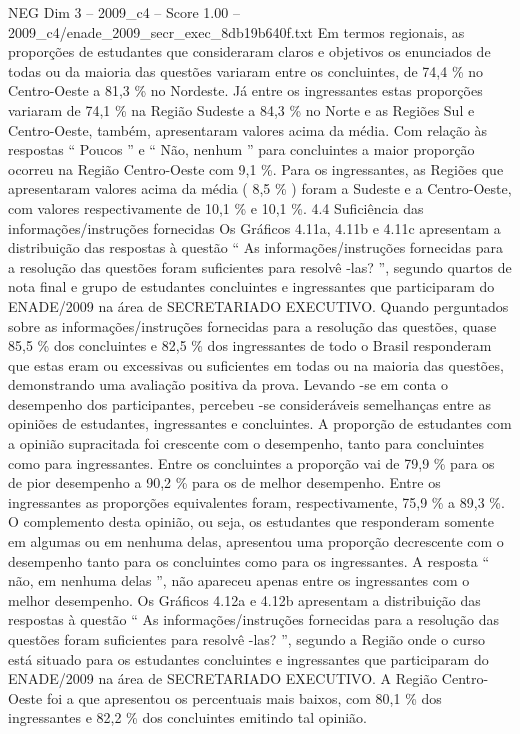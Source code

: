 \begin{textsample}{NEG Dim 3 – 2009\_c4 – Score 1.00 – 2009\_c4/enade\_2009\_secr\_exec\_8db19b640f.txt}
Em termos regionais, as proporções de estudantes que consideraram claros e objetivos os enunciados de todas ou da maioria das questões variaram entre os concluintes, de 74,4 \% no Centro-Oeste a 81,3 \% no Nordeste.
Já entre os ingressantes estas proporções variaram de 74,1 \% na Região Sudeste a 84,3 \% no Norte e as Regiões Sul e Centro-Oeste, também, apresentaram valores acima da média.
Com relação às respostas “ Poucos ” e “ Não, nenhum ” para concluintes a maior proporção ocorreu na Região Centro-Oeste com 9,1 \%.
Para os ingressantes, as Regiões que apresentaram valores acima da média ( 8,5 \% ) foram a Sudeste e a Centro-Oeste, com valores respectivamente de 10,1 \% e 10,1 \%. 4.4 Suficiência das informações/instruções fornecidas Os Gráficos 4.11a, 4.11b e 4.11c apresentam a distribuição das respostas à questão “ As informações/instruções fornecidas para a resolução das questões foram suficientes para resolvê -las? ”, segundo quartos de nota final e grupo de estudantes concluintes e ingressantes que participaram do ENADE/2009 na área de SECRETARIADO EXECUTIVO.
Quando perguntados sobre as informações/instruções fornecidas para a resolução das questões, quase 85,5 \% dos concluintes e 82,5 \% dos ingressantes de todo o Brasil responderam que estas eram ou excessivas ou suficientes em todas ou na maioria das questões, demonstrando uma avaliação positiva da prova.
Levando -se em conta o desempenho dos participantes, percebeu -se consideráveis semelhanças entre as opiniões de estudantes, ingressantes e concluintes.
A proporção de estudantes com a opinião supracitada foi crescente com o desempenho, tanto para concluintes como para ingressantes.
Entre os concluintes a proporção vai de 79,9 \% para os de pior desempenho a 90,2 \% para os de melhor desempenho.
Entre os ingressantes as proporções equivalentes foram, respectivamente, 75,9 \% a 89,3 \%.
O complemento desta opinião, ou seja, os estudantes que responderam somente em algumas ou em nenhuma delas, apresentou uma proporção decrescente com o desempenho tanto para os concluintes como para os ingressantes.
A resposta “ não, em nenhuma delas ”, não apareceu apenas entre os ingressantes com o melhor desempenho.
Os Gráficos 4.12a e 4.12b apresentam a distribuição das respostas à questão “ As informações/instruções fornecidas para a resolução das questões foram suficientes para resolvê -las? ”, segundo a Região onde o curso está situado para os estudantes concluintes e ingressantes que participaram do ENADE/2009 na área de SECRETARIADO EXECUTIVO.
A Região Centro-Oeste foi a que apresentou os percentuais mais baixos, com 80,1 \% dos ingressantes e 82,2 \% dos concluintes emitindo tal opinião.

\end{textsample}
